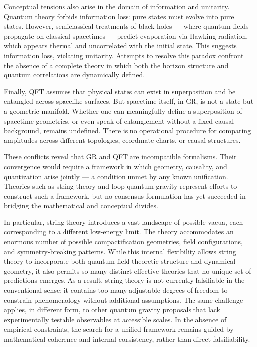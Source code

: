 Conceptual tensions also arise in the domain of information and unitarity. Quantum theory forbids information loss: pure states must evolve into pure states. However, semiclassical treatments of black holes — where quantum fields propagate on classical spacetimes — predict evaporation via Hawking radiation, which appears thermal and uncorrelated with the initial state. This suggests information loss, violating unitarity. Attempts to resolve this paradox confront the absence of a complete theory in which both the horizon structure and quantum correlations are dynamically defined.

Finally, QFT assumes that physical states can exist in superposition and be entangled across spacelike surfaces. But spacetime itself, in GR, is not a state but a geometric manifold. Whether one can meaningfully define a superposition of spacetime geometries, or even speak of entanglement without a fixed causal background, remains undefined. There is no operational procedure for comparing amplitudes across different topologies, coordinate charts, or causal structures.

These conflicts reveal that GR and QFT are incompatible formalisms. Their convergence would require a framework in which geometry, causality, and quantization arise jointly — a condition unmet by any known unification. Theories such as string theory and loop quantum gravity represent efforts to construct such a framework, but no consensus formulation has yet succeeded in bridging the mathematical and conceptual divides.

In particular, string theory introduces a vast landscape of possible vacua, each corresponding to a different low-energy limit. The theory accommodates an enormous number of possible compactification geometries, field configurations, and symmetry-breaking patterns. While this internal flexibility allows string theory to incorporate both quantum field theoretic structure and dynamical geometry, it also permits so many distinct effective theories that no unique set of predictions emerges. As a result, string theory is not currently falsifiable in the conventional sense: it contains too many adjustable degrees of freedom to constrain phenomenology without additional assumptions. The same challenge applies, in different form, to other quantum gravity proposals that lack experimentally testable observables at accessible scales. In the absence of empirical constraints, the search for a unified framework remains guided by mathematical coherence and internal consistency, rather than direct falsifiability.

